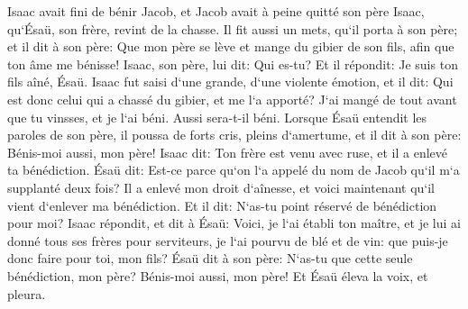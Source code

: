 \verse Isaac avait fini de bénir Jacob, et Jacob avait à peine quitté son père Isaac, qu`Ésaü, son frère, revint de la chasse. 
\verse Il fit aussi un mets, qu`il porta à son père; et il dit à son père: Que mon père se lève et mange du gibier de son fils, afin que ton âme me bénisse! 
\verse Isaac, son père, lui dit: Qui es-tu? Et il répondit: Je suis ton fils aîné, Ésaü. 
\verse Isaac fut saisi d`une grande, d`une violente émotion, et il dit: Qui est donc celui qui a chassé du gibier, et me l`a apporté? J`ai mangé de tout avant que tu vinsses, et je l`ai béni. Aussi sera-t-il béni. 
\verse Lorsque Ésaü entendit les paroles de son père, il poussa de forts cris, pleins d`amertume, et il dit à son père: Bénis-moi aussi, mon père! 
\verse Isaac dit: Ton frère est venu avec ruse, et il a enlevé ta bénédiction. 
\verse Ésaü dit: Est-ce parce qu`on l`a appelé du nom de Jacob qu`il m`a supplanté deux fois? Il a enlevé mon droit d`aînesse, et voici maintenant qu`il vient d`enlever ma bénédiction. Et il dit: N`as-tu point réservé de bénédiction pour moi? 
\verse Isaac répondit, et dit à Ésaü: Voici, je l`ai établi ton maître, et je lui ai donné tous ses frères pour serviteurs, je l`ai pourvu de blé et de vin: que puis-je donc faire pour toi, mon fils? 
\verse Ésaü dit à son père: N`as-tu que cette seule bénédiction, mon père? Bénis-moi aussi, mon père! Et Ésaü éleva la voix, et pleura. 
